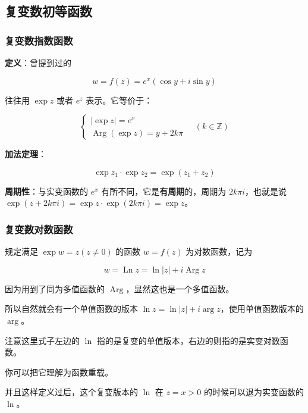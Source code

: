 \subsection{复变数初等函数}
\label{复变数初等函数}
\subsubsection{复变数指数函数}
\label{复变数指数函数}
\textbf{定义}：曾提到过的

\[
w=f(z)=e^x(\cos y +i\sin y)
\]

往往用 \(\exp z\) 或者 \(e^z\) 表示。它等价于：

\begin{equation*}
\begin{cases}
    |\exp z|=e^x\\
    \operatorname{Arg}(\exp z)=y+2k\pi
\end{cases}
\quad (k \in \mathbb{Z})
\end{equation*}

\textbf{加法定理}：

\[
\exp z_1 \cdot \exp z_2 = \exp (z_1+z_2)
\]

\textbf{周期性}：与实变函数的 \(e^x\) 有所不同，它是\textbf{有周期}的，周期为
\(2k\pi i\)，也就是说
\(\exp(z+2k\pi i)=\exp z \cdot \exp(2k\pi i)=\exp z\)。
\subsubsection{复变数对数函数}
\label{复变数对数函数}
规定满足 \(\exp w=z(z \ne 0)\) 的函数 \(w=f(z)\) 为对数函数，记为

\[
w=\operatorname{Ln}z=\ln |z|+i\operatorname{Arg}z
\]

因为用到了同为多值函数的
\(\operatorname{Arg}\)，显然这也是一个多值函数。

所以自然就会有一个单值函数的版本
\(\ln z = \ln |z|+i\operatorname{arg}z\)，使用单值函数版本的
\(\operatorname{arg}\)。

\begin{tcolorbox}[title={Note},colback=red!5!white
,colframe=red!75!black
,colbacktitle=yellow!50!red
,coltitle=red!25!black, fonttitle=\bfseries,subtitle style={boxrule=0.4pt, colback=yellow!50!red!25!white}]
注意这里式子左边的 \(\ln\)
指的是复变的单值版本，右边的则指的是实变对数函数。

你可以把它理解为函数重载。

并且这样定义过后，这个复变版本的 \(\ln\) 在 \(z=x>0\) 的时候可以退为实变函数的 \(\ln\)。

\end{tcolorbox}

